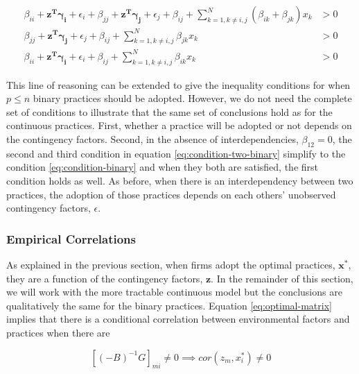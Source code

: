\documentclass[12pt]{article}
\begin{document}
\begin{equation} \label{eq:condition-two-binary}
    \begin{aligned}
        \beta_{ii} + \mathbf{z^T} \mathbf{\gamma_i} + \epsilon_i
        + \beta_{jj} + \mathbf{z^T} \mathbf{\gamma_j} + \epsilon_j
        + \beta_{ij} + \sum^{N}_{k = 1, k \neq i,j} (\beta_{ik} + \beta_{jk}) x _k &> 0 \\
        \beta_{jj} + \mathbf{z^T} \mathbf{\gamma_j} + \epsilon_j 
        + \beta_{ij} + \sum^{N}_{k = 1, k \neq i,j} \beta_{jk} x_k &> 0 \\
        \beta_{ii} + \mathbf{z^T} \mathbf{\gamma_i} + \epsilon_i
        + \beta_{ij} + \sum^{N}_{k = 1, k \neq i,j} \beta_{ik} x_k &> 0 
    \end{aligned} 
\end{equation}

This line of reasoning can be extended to give the inequality conditions for when $p \leq n$ binary practices should be adopted. However, we do not need the complete set of conditions to illustrate that the same set of conclusions hold as for the continuous practices. First, whether a practice will be adopted or not depends on the contingency factors. Second, in the absence of interdependencies, $\beta_{12} = 0$, the second and third condition in equation \eqref{eq:condition-two-binary} simplify to the condition \eqref{eq:condition-binary} and when they both are satisfied, the first condition holds as well. As before, when there is an interdependency between two practices, the adoption of those practices depends on each others' unobserved contingency factors, $\epsilon$.

\subsubsection{Empirical Correlations}

As explained in the previous section, when firms adopt the optimal practices, $\mathbf{x^*}$, they are a function of the contingency factors, $\mathbf{z}$. In the remainder of this section, we will work with the more tractable continuous model but the conclusions are qualitatively the same for the binary practices. Equation \eqref{eq:optimal-matrix} implies that there is a conditional correlation between environmental factors and practices when there are 

\begin{equation}\label{eq:contingency-correlation}
    [(-B)^{-1} G]_{mi} \neq 0 \implies cor(z_m, x^*_i) \neq 0
\end{equation}
\end{document}
